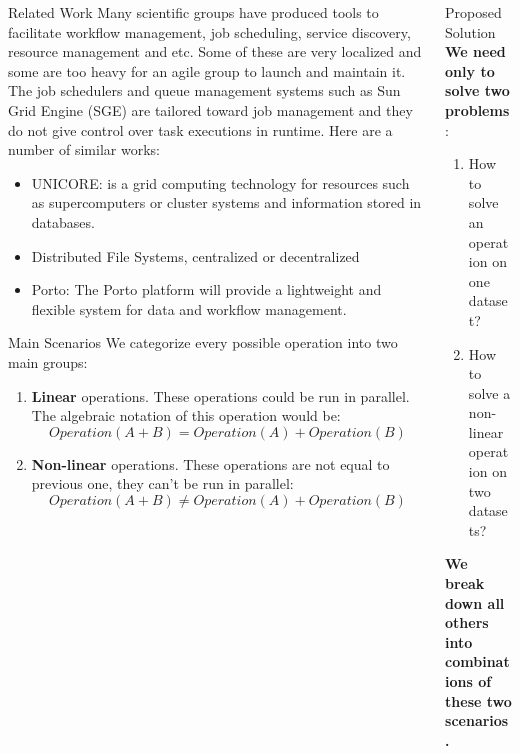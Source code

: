 \documentclass[final,hyperref={pdfpagelabels=true}]{beamer}
\begin{document}
\begin{frame}
\begin{columns}[t]
\begin{column}{.45\textwidth}
      \begin{block}{Related Work}
        Many scientific groups have produced tools to facilitate workflow management, job scheduling,
        service discovery, resource management and etc. Some of these are very localized and some are
        too heavy for an agile group to launch and maintain it. The job schedulers and queue management
        systems such as Sun Grid Engine (SGE) are tailored toward job management and they do not give
        control over task executions in runtime.
        Here are a number of similar works:
        \begin{itemize}
        \item UNICORE: is a grid computing technology for resources such as supercomputers or cluster systems and information stored in databases.\cite{unicore}
        \item Distributed File Systems, centralized or decentralized
        \item Porto: The Porto platform will provide a lightweight and flexible system for data and workflow management.\cite{porto}
        \end{itemize}
      \end{block}



      \begin{block}{Main Scenarios}
      We categorize every possible operation into two main groups:
      \begin{enumerate}
      \item \textbf{Linear} operations. These operations could be run in parallel. The algebraic notation of this operation would be:
      \[ Operation(A + B) = Operation(A) + Operation(B) \]
      \item \textbf{Non-linear} operations. These operations are not equal to previous one, they can't be run in parallel:
      \[ Operation(A + B) \neq Operation(A) + Operation(B) \]
      \end{enumerate}
      \end{block}

    \end{column}

    \begin{column}{.45\textwidth}

      \begin{block}{Proposed Solution}
      \textbf{We need only to solve two problems}:
      \begin{enumerate}
      \item How to solve an operation on one dataset?
      \item How to solve a non-linear operation on two datasets?
      \end{enumerate}
      \textbf{We break down all others into combinations of these two scenarios.}
      

\end{block}
\end{column}
\end{columns}
\end{frame}
\end{document}
